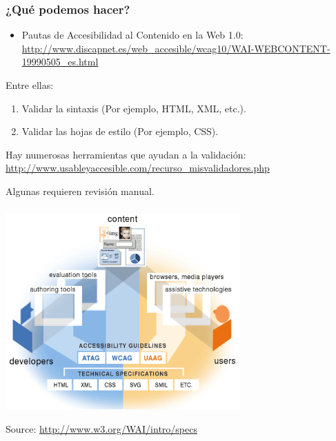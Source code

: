 \begin{frame}
\frametitle{¿Qué podemos hacer?}

\begin{itemize}
  \item Pautas de Accesibilidad al Contenido en la Web 1.0: \url{http://www.discapnet.es/web_accesible/wcag10/WAI-WEBCONTENT-19990505_es.html}
\end{itemize}

Entre ellas:

\begin{enumerate}
   \item Validar la sintaxis (Por ejemplo, HTML, XML, etc.).
   \item Validar las hojas de estilo (Por ejemplo, CSS).
\end{enumerate}

Hay numerosas herramientas que ayudan a la validación: \url{http://www.usableyaccesible.com/recurso\_misvalidadores.php}

Algunas requieren revisión manual.

\end{frame}



\begin{frame}
\frametitle{}

\begin{center}
  \includegraphics[width=9cm]{figs/accesibilidad.png}
\end{center}


\begin{flushright}
{\tiny
Source: \url{http://www.w3.org/WAI/intro/specs}
}
\end{flushright}

\end{frame}


